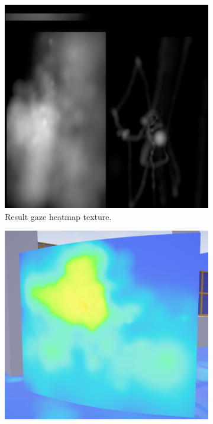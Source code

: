 \begin{figure}[!ht]\centering
    \begin{subfigure}[b]{0.31\textwidth}
        \centering
        \includegraphics[width=\textwidth]{img/data/Panel11/resultant/Result.png}
        \caption{Result gaze heatmap texture.}
    \end{subfigure}
    \hfill
    \begin{subfigure}[b]{0.335\textwidth}
        \centering
        \includegraphics[width=\textwidth]{img/data/Panel11/resultant/heatmap.png}

\end{subfigure}
\end{figure}
